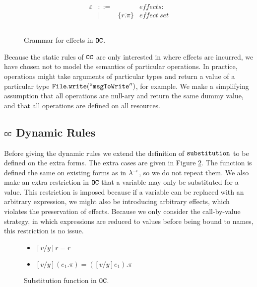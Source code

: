 \begin{figure}[h]
\vspace{-5pt}

\[
\begin{array}{lll}

\begin{array}{lllr}

\varepsilon & ::= & ~ & effects: \\
	& | & \{ \overline{r.\pi} \} & effect~set \\
	&&\\

\end{array}

\end{array}
\]

\vspace{-7pt}
\caption{Grammar for effects in $\mathtt{OC}$.}
\label{fig:opercalc_fx}
\end{figure}

Because the static rules of $\mathtt{OC}$ are only interested in where effects are incurred, we have chosen not to model the semantics of particular operations. In practice, operations might take arguments of particular types and return a value of a particular type $\mathtt{File.write(``msgToWrite'')}$, for example. We make a simplifying assumption that all operations are null-ary and return the same dummy value, and that all operations are defined on all resources. 

\subsection{$\mathtt{OC}$ Dynamic Rules}

Before giving the dynamic rules we extend the definition of $\mathtt{substitution}$ to be defined on the extra forms. The extra cases are given in Figure \ref{fig:opercalc_sub_defn}. The function is defined the same on existing forms as in $\lambda^{\rightarrow}$, so we do not repeat them. We also make an extra restriction in $\mathtt{OC}$ that a variable may only be substituted for a value. This restriction is imposed because if a variable can be replaced with an arbitrary expression, we might also be introducing arbitrary effects, which violates the preservation of effects. Because we only consider the call-by-value strategy, in which expressions are reduced to values before being bound to names, this restriction is no issue.

\begin{figure}[h]


\begin{itemize}
	\setlength\itemsep{-0.7em}
	\item[] $[v/y]r = r$
	\item[] $[v/y](e_1.\pi) = ([v/y]e_1).\pi$
\end{itemize}

\vspace{-7pt}
\caption{Substitution function in $\mathtt{OC}$.}
\label{fig:opercalc_sub_defn}
\end{figure}


